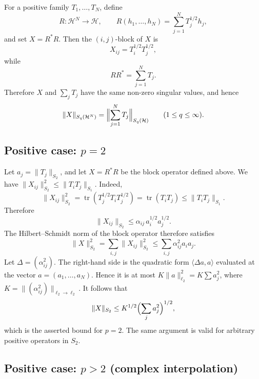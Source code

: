 \documentclass[11pt]{article}
\theoremstyle{definition}
\newcommand{\1}{\mathbf{1}}
\DeclareMathOperator{\tr}{tr}
\begin{document}
For a positive family $T_1,\dots,T_N$, define
\[
R:\mathcal H^N\to\mathcal H,\qquad
R(h_1,\dots,h_N)=\sum_{j=1}^N T_j^{1/2}h_j,
\]
and set $X=R^*R$. Then the $(i,j)$-block of $X$ is
\[
X_{ij}=T_i^{1/2}T_j^{1/2},
\]
while
\[
RR^*=\sum_{j=1}^N T_j.
\]
Therefore $X$ and $\sum_j T_j$ have the same non-zero singular values, and hence
\[
\|X\|_{S_q(\mathcal H^N)}
=
\Bigl\|\sum_{j=1}^N T_j\Bigr\|_{S_q(\mathcal H)}
\qquad (1\le q\le \infty).
\]

\subsection{Positive case: $p=2$} 

Let $a_j=\|T_j\|_{S_2}$, and let $X=R^*R$ be the block operator defined above. 
We have  $\|X_{ij}\|_{S_2}^2\leq\|T_i T_j\|_{S_1}$. Indeed,
\[
\|X_{ij}\|_{S_2}^2
=\tr(T_j^{1/2}T_iT_j^{1/2})
=\tr(T_iT_j)
\le \|T_iT_j\|_{S_1}.
\]
Therefore
\[
\|X_{ij}\|_{S_2}\leq\alpha_{ij}\,a_i^{1/2}a_j^{1/2}.
\]
The Hilbert--Schmidt norm of the block operator therefore satisfies
\[
\|X\|_{S_2}^2=\sum_{i,j}\|X_{ij}\|_{S_2}^2\leq\sum_{i,j}\alpha_{ij}^2 a_i a_j.
\]
Let $\Delta=(\alpha_{ij}^2)$. The right-hand side is the quadratic form $\langle\Delta a,a\rangle$ evaluated at the vector $a=(a_1,\dots,a_N)$. Hence it is at most $K\|a\|_{\ell_2}^2=K\sum a_j^2$, where $K=\|(\alpha_{ij}^2)\|_{\ell_2\to\ell_2}$. It follows that
\[
\|X\|_{S_2}\leq K^{1/2}\Bigl(\sum_j a_j^2\Bigr)^{1/2},
\]
which is the asserted bound for $p=2$. The same argument is valid for
arbitrary positive operators in $S_2$. 

\subsection{Positive case: $p>2$ (complex interpolation)}
\label{subsec:positive-pgtwo}
\end{document}
